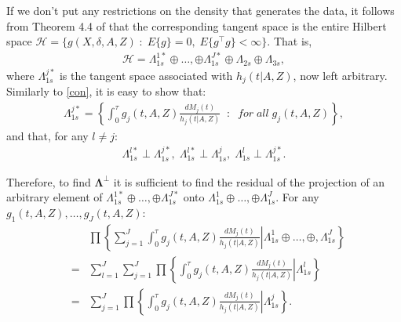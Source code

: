 \documentclass[11pt]{article}
\newcommand{\ee}{\end{eqnarray}}
\newcommand{\eqnn}{\begin{eqnarray*}}
\newcommand{\een}{\end{eqnarray*}}
\newcommand{\be}{\begin{eqnarray}}
\begin{document}
If we don't put any restrictions on the density that generates the data,  it follows from Theorem 4.4 of \cite{tsiatis2007semiparametric} that the corresponding tangent space is the entire Hilbert space $\mathcal{H}=\{g(X,\delta,A,Z)\;:\;E\{g\}=0,\;E\{g^\top g\}<\infty\}$.
That is, 
\be\label{decgen}
\mathcal{H}=\Lambda_{1s}^{1*}\oplus\ldots,\oplus\Lambda_{1s}^{J*}\oplus \Lambda_{2s} \oplus \Lambda_{3s},
\ee
where $\Lambda_{1s}^{j*}$ is the tangent space associated with $h_j(t | A,Z)$, now left arbitrary.
Similarly to \eqref{con},
 it is easy to show that:
\be\label{genspace}
\Lambda_{1s}^{j*}=\left\{\int_0^\tau g_j(t,A,Z) \frac{dM_j(t)}{h_j(t | A,Z)}\;\;:\;\;for\;all\;g_j(t,A,Z)\right\},
\ee
and that, for any $l\neq j$:
\be\label{orth}
\Lambda_{1s}^{l*}\perp\Lambda_{1s}^{j*},\; \Lambda_{1s}^{l*}\perp\Lambda_{1s}^{j},\; \Lambda_{1s}^{l}\perp\Lambda_{1s}^{j*}.
\ee


Therefore, to find $\mathbf\Lambda^\perp$ it is sufficient to find the residual of the projection of an arbitrary element of $\Lambda_{1s}^{1*}\oplus\ldots,\oplus\Lambda_{1s}^{J*}$ onto $\Lambda_{1s}^{1}\oplus\ldots,\oplus\Lambda_{1s}^{J}$.
For any $g_1(t,A,Z), \ldots, g_J(t,A,Z)$:
\eqnn
&&\prod\left\{ \sum_{j=1}^J \left.\int_0^\tau g_j(t,A,Z) \frac{dM_j(t)}{h_j(t | A,Z)}\right| \Lambda_{1s}^{1}\oplus\ldots,\oplus,\Lambda_{1s}^{J}\right\}\\
&=&\sum_{l=1}^J\sum_{j=1}^J\prod\left\{\left.\int_0^\tau g_j(t,A,Z) \frac{dM_j(t)}{h_j(t | A,Z)}\right| \Lambda_{1s}^{l}\right\}\\&=&\sum_{j=1}^J\prod\left\{\left.\int_0^\tau g_j(t,A,Z) \frac{dM_j(t)}{h_j(t | A,Z)}\right| \Lambda_{1s}^{j}\right\}.\een
\end{document}
